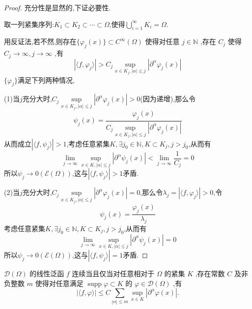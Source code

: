 \documentclass[lang=cn,newtx,10pt,scheme=chinese,thmcnt=chapter]{elegantbook}
\begin{document}
\begin{proof}
  充分性是显然的,下证必要性.

取一列紧集序列:$K_1\subset{K_2\subset{\cdots \subset{\Omega}}}$,使得$\bigcup\limits_{i=1}^{\infty}K_i=\Omega$.
  
  用反证法,若不然,则存在\(\{\varphi_j(x)\}\subset{C^\infty(\Omega)}\) 使得对任意 \(j \in  \mathbb{N}\) ,存在 \(C_j\) 使得 \(C_j\to \infty,j\to \infty\) ,有
\begin{equation*}
\left| {\langle f,\varphi_j \rangle }\right|  >  C_j\mathop{\sup }\limits_{{x \in  K_j,|\alpha|\leqslant j}}\left| {{\partial }^{\alpha }\varphi_j \left( x\right) }\right|
\end{equation*}
  $\{\varphi_j\}$满足下列两种情况,

  (1)当$j$充分大时,$C_j\mathop{\sup }\limits_{{x \in  K_j,|\alpha|\leqslant j}}\left| {{\partial }^{\alpha }\varphi_j \left( x\right) }\right|>0$(因为递增),那么令\[
\psi_j(x)=\frac{\varphi_j(x)}{C_j\mathop{\sup }\limits_{{x \in  K_j,|\alpha|\leqslant j}}\left| {{\partial }^{\alpha }\varphi_j \left( x\right) }\right|}
  \]
从而成立$|\langle f,\psi_j\rangle|>1$,考虑任意紧集$K,\exists j_0\in \mathbb{N},K\subset{ K_j},j>j_0$,从而有
\[
\lim\limits_{j\to \infty}\mathop{\sup }\limits_{{x \in  K,|\alpha|\leqslant j}}\left| {{\partial }^{\alpha }\psi_j \left( x\right) }\right|<\lim\limits_{j\to \infty}\frac{1}{C_j}=0
\]
所以$\psi_j\to 0(\mathcal{E}(\Omega))$,这与$|\langle f,\psi_j\rangle|>1$矛盾.

(2)当$j$充分大时,$C_j\mathop{\sup }\limits_{{x \in  K_j,|\alpha|\leqslant j}}\left| {{\partial }^{\alpha }\varphi_j \left( x\right) }\right|=0$,那么令$\lambda_j=|\langle f,\varphi_j\rangle|>0$,令\[
\psi_j(x)=\frac{\varphi_j(x)}{\lambda_j}
  \]
  考虑任意紧集$K,\exists j_0\in \mathbb{N},K\subset{ K_j},j>j_0$,从而有
\[
\lim\limits_{j\to \infty}\mathop{\sup }\limits_{{x \in  K,|\alpha|\leqslant j}}\left| {{\partial }^{\alpha }\psi_j \left( x\right) }\right|=0
\]
所以$\psi_j\to 0(\mathcal{E}(\Omega))$,这与$|\langle f,\psi_j\rangle|=1$矛盾.
\end{proof}
\begin{theorem}
  \(\mathcal{D}\left( \Omega \right)\) 的线性泛函 \(f\) 连续当且仅当对任意相对于 \(\Omega\) 的紧集 \(K\) ,存在常数 \(C\) 及非负整数 \(m\) 使得对任意满足 \(\operatorname{supp}\varphi  \subset  K\) 的 \(\varphi  \in  \mathcal{D}\left( \Omega \right)\) ,有
\begin{equation}
\left| {\langle f,\varphi \rangle }\right|  \leqslant  C\mathop{\sum }\limits_{{\left| \alpha \right|  \leqslant  m}}\mathop{\sup }\limits_{{x \in  K}}\left| {{\partial }^{\alpha }\varphi \left( x\right) }\right| . \label{3.7}
\end{equation}
\end{theorem}
\end{document}
